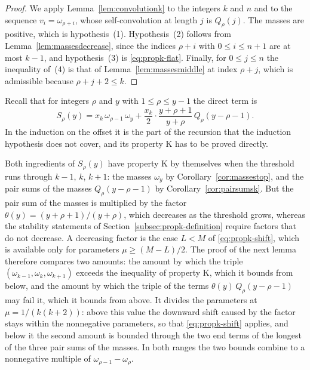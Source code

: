 \documentclass{amsart}
\makeatletter
\theoremstyle{definition}
\theoremstyle{remark}
\numberwithin{equation}{section}
\def\subsection{\@startsection{subsection}{2}\z@{.5\linespacing\@plus.7\linespacing}{-.5em}{\normalfont\bfseries\boldmath}}
\makeatother
\begin{document}
\begin{proof}
We apply Lemma~\ref{lem:convolutionk} to the integers $k$ and $n$ and to
the sequence $v_i=\omega_{\rho+i}$, whose self-convolution at length $j$ is
$Q_\rho(j)$. The masses are positive, which is hypothesis~(1).
Hypothesis~(2) follows from Lemma~\ref{lem:massesdecrease}, since the
indices $\rho+i$ with $0\le i\le n+1$ are at most $k-1$, and
hypothesis~(3) is \eqref{eq:propk-flat}. Finally, for $0\le j\le n$ the
inequality of~(4) is that of Lemma~\ref{lem:massesmiddle} at index
$\rho+j$, which is admissible because $\rho+j+2\le k$.
\end{proof}

\subsection{The direct term}\label{subsec:propk-direct}

Recall that for integers $\rho$ and $y$ with $1\le\rho\le y-1$ the direct
term is
\[
S_\rho(y)=x_k\,\omega_{\rho-1}\,\omega_y
+\frac{x_k}{2}\cdot\frac{y+\rho+1}{y+\rho}\,Q_\rho(y-\rho-1) .
\]
In the induction on the offset it is the part of the recursion
that the induction hypothesis does not cover, and
its property K has to be proved directly.

Both ingredients of $S_\rho(y)$ have property K by themselves when the
threshold runs through $k-1$, $k$, $k+1$: the masses $\omega_y$ by
Corollary~\ref{cor:massestop}, and the pair sums of the masses
$Q_\rho(y-\rho-1)$ by Corollary~\ref{cor:pairsumsk}. But the pair sum of
the masses is multiplied by the factor
$\theta(y)=(y+\rho+1)/(y+\rho)$, which decreases as the threshold grows,
whereas the stability statements of
Section~\ref{subsec:propk-definition} require factors that do not decrease.
A decreasing factor is the case $L<M$ of \eqref{eq:propk-shift}, which is
available only for parameters $\mu\ge(M-L)/2$. The proof of the next lemma
therefore compares two amounts: the amount by which the triple
$(\omega_{k-1},\omega_k,\omega_{k+1})$ exceeds the inequality of property
K, which it bounds from below, and the amount by which the triple of the
terms $\theta(y)\,Q_\rho(y-\rho-1)$ may fail it, which it bounds from
above. It divides the parameters
at $\mu=1/(k(k+2))$: above this value the downward shift caused by the
factor stays within the nonnegative parameters, so that
\eqref{eq:propk-shift} applies, and below it the second amount is bounded
through the two end terms of the longest of the three pair sums of the
masses. In
both ranges the two bounds combine to a
nonnegative multiple of
$\omega_{\rho-1}-\omega_\rho$.
\end{document}
